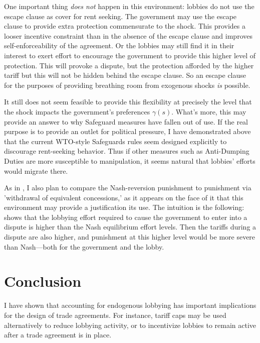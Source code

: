 \documentclass[12pt]{article}
\newcommand{\ga}{\gamma}
\begin{document}
One important thing \textit{does not} happen in this environment: lobbies do not use the escape clause as cover for rent seeking. The government may use the escape clause to provide extra protection commensurate to the shock. This provides a looser incentive constraint than in the absence of the escape clause and improves self-enforceability of the agreement. Or the lobbies may still find it in their interest to exert effort to encourage the government to provide this higher level of protection. This will provoke a dispute, but the protection afforded by the higher tariff but this will not be hidden behind the escape clause. So an escape clause for the purposes of providing breathing room from exogenous shocks \textit{is} possible.

It still does not seem feasible to provide this flexibility at precisely the level that the shock impacts the government's preferences $\ga(s)$. What's more, this may provide an answer to why Safeguard measures have fallen out of use. If the real purpose is to provide an outlet for political pressure, I have demonstrated above that the current WTO-style Safeguards rules seem designed explicitly to discourage rent-seeking behavior. Thus if other measures such as Anti-Dumping Duties are more susceptible to manipulation, it seems natural that lobbies' efforts would migrate there.

As in \Textcite{zissimos}, I also plan to compare the Nash-reversion punishment to punishment via 'withdrawal of equivalent concessions,' as it appears on the face of it that this environment may provide a justification its use. The intuition is the following: \Textcite{buzard2013a} shows that the lobbying effort required to cause the government to enter into a dispute is higher than the Nash equilibrium effort levels. Then the tariffs during a dispute are also higher, and punishment at this higher level would be more severe than Nash---both for the government and the lobby.

		


%

\section{Conclusion}
\label{sec:concl}
I have shown that accounting for endogenous lobbying has important implications for the design of trade agreements. For instance, tariff caps may be used alternatively to reduce lobbying activity, or to incentivize lobbies to remain active after a trade agreement is in place.
\end{document}
